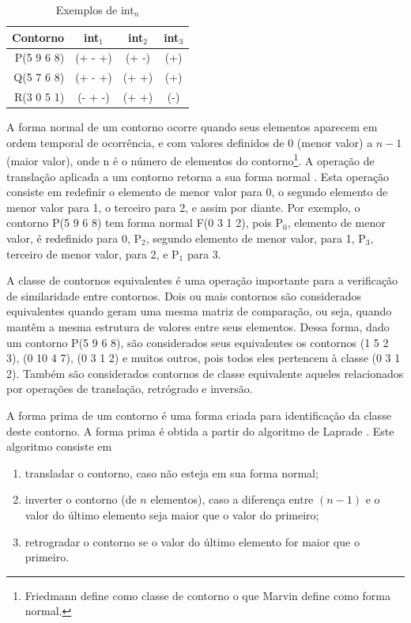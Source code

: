 \begin{table}
  \centering
  \begin{tabular}{r|ccc}
    Contorno & int$_1$ & int$_2$ & int$_3$ \\
    \hline
    P(5 9 6 8) & (+ - +) & (+ -) & (+) \\
    Q(5 7 6 8) & (+ - +) & (+ +) & (+) \\
    R(3 0 5 1) & (- + -) & (+ +) & (-)
  \end{tabular}
  \caption{Exemplos de int$_n$}
  \label{tab:int-contornos}
\end{table}

A forma normal de um contorno ocorre quando seus elementos aparecem em
ordem temporal de ocorrência, e com valores definidos de 0 (menor
valor) a $n-1$ (maior valor), onde n é o número de elementos do
contorno\footnote{Friedmann define como classe de contorno o que
  Marvin define como forma normal.}. A operação de translação aplicada
a um contorno retorna a sua forma normal
\cite[p. 228]{marvin.ea87:relating}. Esta operação consiste em
redefinir o elemento de menor valor para 0, o segundo elemento de
menor valor para 1, o terceiro para 2, e assim por diante. Por
exemplo, o contorno P(5 9 6 8) tem forma normal F(0 3 1 2), pois
P$_0$, elemento de menor valor, é redefinido para 0, P$_2$, segundo
elemento de menor valor, para 1, P$_3$, terceiro de menor valor, para
2, e P$_1$ para 3.

A classe de contornos equivalentes é uma operação importante para a
verificação de similaridade entre contornos. Dois ou mais contornos
são considerados equivalentes quando geram uma mesma matriz de
comparação, ou seja, quando mantêm a mesma estrutura de valores entre
seus elementos. Dessa forma, dado um contorno P(5 9 6 8), são
considerados seus equivalentes os contornos (1 5 2 3), (0 10 4 7), (0
3 1 2) e muitos outros, pois todos eles pertencem à classe (0 3 1
2). Também são considerados contornos de classe equivalente aqueles
relacionados por operações de translação, retrógrado e inversão.

A forma prima de um contorno é uma forma criada para identificação da
classe deste contorno. A forma prima é obtida a partir do algoritmo de
Laprade \cite[p. 234]{marvin.ea87:relating}. Este algoritmo consiste
em
\begin{enumerate}
\item transladar o contorno, caso não esteja em sua forma normal;
\item inverter o contorno (de $n$ elementos), caso a diferença entre
  $(n - 1)$ e o valor do último elemento seja maior que o valor do
  primeiro;
\item retrogradar o contorno se o valor do último elemento for maior
  que o primeiro.
\end{enumerate}

